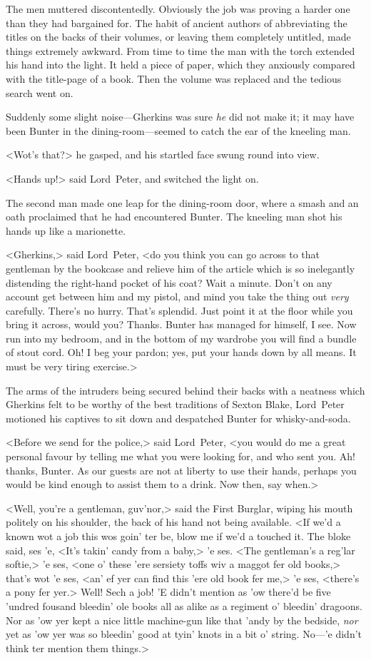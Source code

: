 The men muttered discontentedly. Obviously the job was proving a harder one than they had bargained for. The habit of ancient authors of abbreviating the titles on the backs of their volumes, or leaving them completely untitled, made things extremely awkward. From time to time the man with the torch extended his hand into the light. It held a piece of paper, which they anxiously compared with the title-page of a book. Then the volume was replaced and the tedious search went on.

Suddenly some slight noise—Gherkins was sure \textit{he} did not make it; it may have been Bunter in the dining-room—seemed to catch the ear of the kneeling man.

<Wot's that?> he gasped, and his startled face swung round into view.

<Hands up!> said Lord~Peter, and switched the light on.

The second man made one leap for the dining-room door, where a smash and an oath proclaimed that he had encountered Bunter. The kneeling man shot his hands up like a marionette.

<Gherkins,> said Lord~Peter, <do you think you can go across to that gentleman by the bookcase and relieve him of the article which is so inelegantly distending the right-hand pocket of his coat? Wait a minute. Don't on any account get between him and my pistol, and mind you take the thing out \textit{very} carefully. There's no hurry. That's splendid. Just point it at the floor while you bring it across, would you? Thanks. Bunter has managed for himself, I see. Now run into my bedroom, and in the bottom of my wardrobe you will find a bundle of stout cord. Oh! I beg your pardon; yes, put your hands down by all means. It must be very tiring exercise.>

The arms of the intruders being secured behind their backs with a neatness which Gherkins felt to be worthy of the best traditions of Sexton Blake, Lord~Peter motioned his captives to sit down and despatched Bunter for whisky-and-soda.

<Before we send for the police,> said Lord~Peter, <you would do me a great personal favour by telling me what you were looking for, and who sent you. Ah! thanks, Bunter. As our guests are not at liberty to use their hands, perhaps you would be kind enough to assist them to a drink. Now then, say when.>

<Well, you're a gentleman, guv'nor,> said the First Burglar, wiping his mouth politely on his shoulder, the back of his hand not being available. <If we'd a known wot a job this wos goin' ter be, blow me if we'd a touched it. The bloke said, ses 'e, <It's takin' candy from a baby,> 'e ses. <The gentleman's a reg'lar softie,> 'e ses, <one o' these 'ere sersiety toffs wiv a maggot fer old books,> that's wot 'e ses, <an' ef yer can find this 'ere old book fer me,> 'e ses, <there's a pony fer yer.> Well! Sech a job! 'E didn't mention as 'ow there'd be five 'undred fousand bleedin' ole books all as alike as a regiment o' bleedin' dragoons. Nor as 'ow yer kept a nice little machine-gun like that 'andy by the bedside, \textit{nor} yet as 'ow yer was so bleedin' good at tyin' knots in a bit o' string. No—'e didn't think ter mention them things.>

